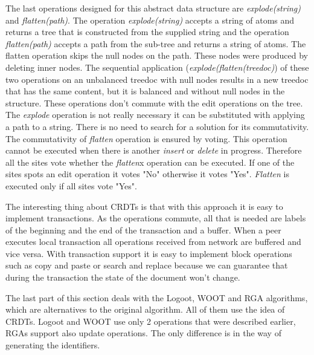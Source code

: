 \documentclass[12pt,oneside]{fithesis2}
\begin{document}
\par The last operations designed for this abstract data structure are \textit{explode(string)} and \textit{flatten(path)}. The operation \textit{explode(string)} accepts a string of atoms and returns a tree that is constructed from the supplied string and the operation \textit{flatten(path)} accepts a path from the sub-tree and returns a string of atoms. The flatten operation skips the null nodes on the path. These nodes were produced by deleting inner nodes. The sequential application (\textit{explode(flatten(treedoc)}) of these two operations on an unbalanced treedoc with null nodes results in a new treedoc that has the same content, but it is balanced and without null nodes in the structure. These operations don't commute with the edit operations on the tree. The \textit{explode} operation is not really necessary it can be substituted with applying a path to a string. There is no need to search for a solution for its commutativity. The commutativity of \textit{flatten} operation is ensured by voting. This operation cannot be executed when there is another \textit{insert} or \textit{delete} in progress. Therefore all the sites vote whether the \textit{flatten}x operation can be executed. If one of the sites spots an edit operation it votes "No" otherwise it votes "Yes". \textit{Flatten} is executed only if all sites vote "Yes".
\par The interesting thing about CRDTs is that with this approach it is easy to implement transactions. As the operations commute, all that is needed are labels of the beginning and the end of the transaction and a buffer. When a peer executes local transaction all operations received from network are buffered and vice versa. With transaction support it is easy to implement block operations such as copy and paste or search and replace because we can guarantee that during the transaction the state of the document won't change.
\par The last part of this section deals with the Logoot, WOOT and RGA algorithms, which are alternatives to the original algorithm. All of them use the idea of CRDTs. Logoot and WOOT use only 2 operations that were described earlier, RGAs support also update operations. The only difference is in the way of generating the identifiers. 
\end{document}
